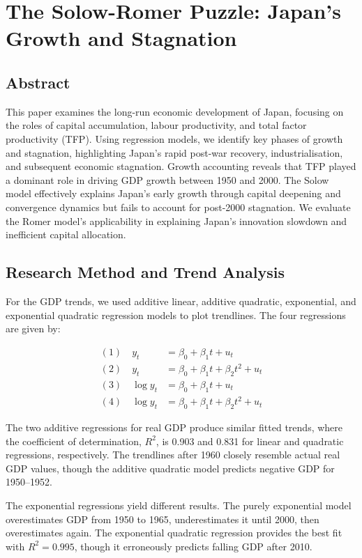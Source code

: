 
\section*{The Solow-Romer Puzzle: Japan's Growth and Stagnation}

\subsection*{Abstract}
This paper examines the long-run economic development of Japan, focusing on the roles of capital accumulation, labour productivity, and total factor productivity (TFP). Using regression models, we identify key phases of growth and stagnation, highlighting Japan's rapid post-war recovery, industrialisation, and subsequent economic stagnation. Growth accounting reveals that TFP played a dominant role in driving GDP growth between 1950 and 2000. The Solow model effectively explains Japan's early growth through capital deepening and convergence dynamics but fails to account for post-2000 stagnation. We evaluate the Romer model's applicability in explaining Japan's innovation slowdown and inefficient capital allocation.

\subsection*{Research Method and Trend Analysis}
For the GDP trends, we used additive linear, additive quadratic, exponential, and exponential quadratic regression models to plot trendlines. The four regressions are given by:

\begin{align*}
(1)\quad y_t &= \beta_0 + \beta_1 t + u_t \\
(2)\quad y_t &= \beta_0 + \beta_1 t + \beta_2 t^2 + u_t \\
(3)\quad \log y_t &= \beta_0 + \beta_1 t + u_t \\
(4)\quad \log y_t &= \beta_0 + \beta_1 t + \beta_2 t^2 + u_t
\end{align*}

The two additive regressions for real GDP produce similar fitted trends, where the coefficient of determination, $R^2$, is 0.903 and 0.831 for linear and quadratic regressions, respectively. The trendlines after 1960 closely resemble actual real GDP values, though the additive quadratic model predicts negative GDP for 1950--1952.

The exponential regressions yield different results. The purely exponential model overestimates GDP from 1950 to 1965, underestimates it until 2000, then overestimates again. The exponential quadratic regression provides the best fit with $R^2 = 0.995$, though it erroneously predicts falling GDP after 2010.


